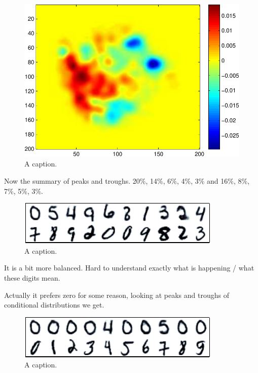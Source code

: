 \documentclass{article}
\begin{document}
\begin{figure}[ht]
\centering
\includegraphics[width=0.98\columnwidth]{figures/many_rbm_witness}
\caption{
A caption.
}
\label{fig:many_rbm_witness}
\end{figure}

Now the summary of peaks and troughs.
20\%, 14\%, 6\%, 4\%, 3\% and 16\%, 8\%, 7\%, 5\%, 3\%.

\begin{figure}[ht]
\centering
\includegraphics[width=0.98\columnwidth]{figures/many_rbm_witness_peaks}
\caption{
A caption.
}
\label{fig:many_rbm_witness_peaks}
\end{figure}

It is a bit more balanced.
Hard to understand exactly what is happening / what these digits mean.

Actually it prefers zero for some reason, looking at peaks and troughs of conditional distributions we get.

\begin{figure}[ht]
\centering
\includegraphics[width=0.98\columnwidth]{figures/many_rbm_cond}
\caption{
A caption.
}
\label{fig:many_rbm_cond}
\end{figure}
\end{document}
